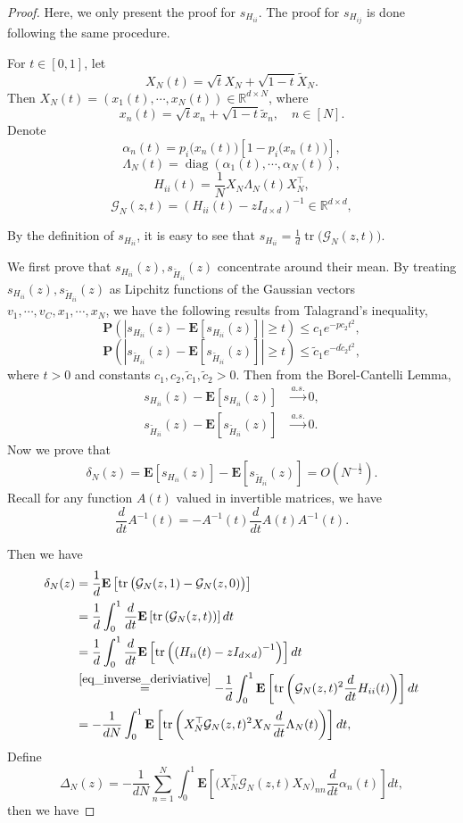 \documentclass{article}
\newcommand{\E}{\mathbf{E}}
\newcommand\mf{\mathbf}
\newcommand\ml{\mathcal}
\newcommand{\wt}{\widetilde}
\newcommand{\rw}{\rightarrow}
\newcommand{\1}{^{(1)}}
\newcommand{\2}{^{(2)}}
\renewcommand{\l}{\left}
\renewcommand{\r}{\right}
\newcommand{\bea}{\begin{equation}\begin{aligned}}
\newcommand{\eea}{\end{aligned}\end{equation}}
\begin{document}
\begin{proof}
Here, we only present the proof for $s_{H_{ii}}$. The proof for $s_{H_{ij}}$ is done following the same procedure.
    
    For $t\in [0,1]$, let 
    $$
    X_N(t)=\sqrt{t}X_N+\sqrt{1-t}\wt{X}_N.
    $$
    Then $X_N(t)=(x_1(t),\cdots,x_N(t)) \in\mathbb{R}^{d\times N}$, where
    $$
    x_n(t)=\sqrt{t}x_n+\sqrt{1-t}\wt{x}_n,\quad n\in [N].
    $$
    Denote
    $$
    {\alpha}_n(t)=p_i\big(x_n(t)\big)\l[1-p_i\big(x_n(t)\big)\r],
    $$
    $$\Lambda_N(t)=\operatorname{diag}(\alpha_1(t),\cdots,\alpha_N(t)),$$
    $$
    H_{ii}(t)=\frac{1}{N}X_N\Lambda_N(t)X_N^\top,$$
    $$\ml{G}_N(z,t)=(H_{ii}(t)-zI_{d\times d})^{-1} \in \mathbb{R}^{d\times d},
    $$

    By the definition of $s_{H_{ii}}$, it is easy to see that $s_{H_{ii}} = \frac{1}{d}\operatorname{tr}\big(\ml{G}_N(z,t)\big)$. 
       
       
       We first prove that $s_{H_{ii}}(z), s_{\wt{H}_{ii}}(z)$ concentrate around their mean. 
    By treating $s_{H_{ii}}(z), s_{\wt{H}_{ii}}(z)$ as Lipchitz functions of the Gaussian vectors $v_1,\cdots,v_C,x_1,\cdots,x_N$, we have the following results from Talagrand's inequality,
    $$
    \mf{P}\l(|s_{H_{ii}}(z)-\E[s_{{H}_{ii}}(z)]|\geq t\r)\leq c_1 e^{-pc_2t^2},
    $$
    $$
    \mf{P}\l(|s_{\wt{H}_{ii}}(z)-\E[s_{\wt{H}_{ii}}(z)]|\geq t\r)\leq \wt{c}_1 e^{-d\wt{c}_2t^2},
    $$
    where $t>0$ and constants $c_1,c_2,\wt{c}_1,\wt{c}_2>0$. Then from the Borel-Cantelli Lemma,
    \bea\label{tg13}
    s_{H_{ii}}(z)-\E[s_{{H}_{ii}}(z)]&\stackrel{a.s.}{\rw}0,\\
    s_{\wt{H}_{ii}}(z)-\E[s_{\wt{H}_{ii}}(z)]&\stackrel{a.s.}{\rw}0.
    \eea
    Now we prove that
    \bea\label{tg12}
    \delta_N(z)=\E[s_{H_{ii}}(z)]-\E[s_{\wt{H}_{ii}}(z)]=O\l(N^{-\frac{1}{2}}\r).
    \eea
    Recall for any function $A(t)$ valued in invertible matrices, we have
    \begin{equation}
    \label{eq_inverse_deriviative}
            \frac{d}{dt}A^{-1}(t)=-A^{-1}(t)\frac{d}{dt}A(t)A^{-1}(t).
    \end{equation}

    Then we have
    \bea\label{derivativeIntegral}
    \delta_N(z)& =\frac{1}{d}\E\l[\operatorname{tr}\big(\ml{G}_N(z,1)-\ml{G}_N(z,0)\big)\r]\\
    &=\frac{1}{d}\int_0^1 \frac{d}{dt}\E\l[\operatorname{tr}\left(\ml{G}_N(z,t)\right)\r]dt\\
    &=\frac{1}{d}\int_0^1 \frac{d}{dt}\E\l[\operatorname{tr}\left(\left(H_{ii}(t) -z I_{d\times d}\right)^{-1}\right)\r]dt\\
    &\overset{\eqref{eq_inverse_deriviative}}{=}-\frac{1}{d}\int_0^1 \E\l[\operatorname{tr}\l(\ml{G}_N(z,t)^2\frac{d}{dt}H_{ii}(t)\r)\r] dt\\
    &=-\frac{1}{dN}\int_0^1\E\l[\operatorname{tr}\l(X_N^\top\ml{G}_N(z,t)^2X_N\frac{d}{dt}\Lambda_N(t)\r)\r]dt, 
    \eea
    Define 
    $$
    \Delta_N(z)=-\frac{1}{dN}\sum_{n=1}^N \int_0^1 \E\l[\big(X_N^\top\ml{G}_N(z,t)X_N\big)_{nn}\frac{d}{dt}\alpha_n(t)\r]dt,
    $$
    then we have 
    

\end{proof}
\end{document}
